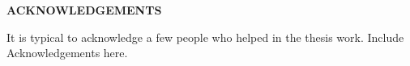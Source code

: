 \newpage
\thispagestyle{plain}

{\centering\bf  ACKNOWLEDGEMENTS\\}\par\vskip 2cm

\singleSpacing
\noindent
It is typical to acknowledge a few people who helped in the thesis
work.  Include Acknowledgements here.

\par\vskip 2cm

\doubleSpacing

\newpage




